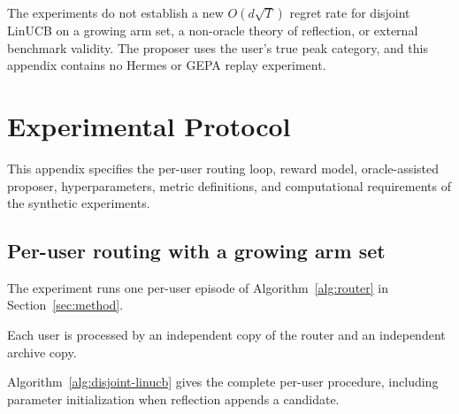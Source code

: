 \documentclass{article} %
\begin{document}
The experiments do not establish a new $O(d\sqrt{T})$ regret rate for disjoint
LinUCB on a growing arm set, a non-oracle theory of reflection, or external
benchmark validity. The proposer uses the user's true peak category, and this
appendix contains no Hermes or GEPA replay experiment.

\section{Experimental Protocol}

\label{app:implementation}

This appendix specifies the per-user routing loop, reward model,
oracle-assisted proposer, hyperparameters, metric definitions, and computational
requirements of the synthetic experiments.

\subsection{Per-user routing with a growing arm set}

\label{app:impl-loop}

The experiment runs one per-user episode of Algorithm~\ref{alg:router} in Section~\ref{sec:method}.

Each user is processed by an independent copy of the router and an independent archive copy.

Algorithm~\ref{alg:disjoint-linucb} gives the complete per-user procedure,
including parameter initialization when reflection appends a candidate.
\end{document}
